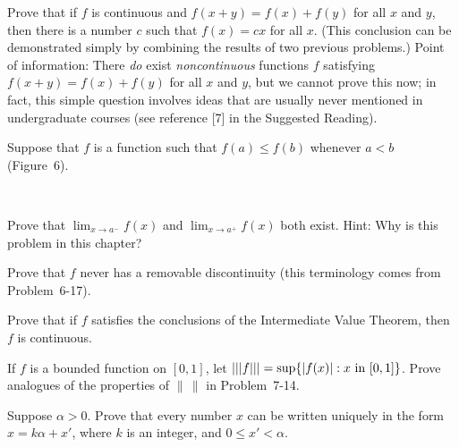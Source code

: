  Prove that if $f$ is continuous and $f(x+y) = f(x) + f(y)$ for all
$x$ and $y$, then there is a number $c$ such that $f(x) = cx$ for all $x$.
(This conclusion can be demonstrated simply by combining the results of two
previous problems.) Point of information: There \emph{do} exist
\emph{noncontinuous} functions $f$ satisfying $f(x+y) = f(x) + f(y)$ for all
$x$ and $y$, but we cannot prove this now; in fact, this simple question
involves ideas that are usually never mentioned in undergraduate courses
(see reference [7] in the Suggested Reading).

 Suppose that $f$ is a function such that $f(a) \leq f(b)$ whenever
$a < b$ (Figure~6).
\begin{center}
\\[0.6em]
\end{center}
\begin{letters}
\item Prove that $\lim_{x \to a^{-}} f(x)$ and $\lim_{x \to a^{+}} f(x)$ both
  exist. Hint: Why is this problem in this chapter?
\item Prove that $f$ never has a removable discontinuity (this terminology
  comes from Problem~6-17).
\item Prove that if $f$ satisfies the conclusions of the Intermediate Value
  Theorem, then $f$ is continuous.
\end{letters}

 If $f$ is a bounded function on $[0,1]$, let
$\lvert\lvert\lvert f \rvert\rvert\rvert
= \sup\{\lvert f(x)\rvert : x\text{ in }[0,1]\}$.
Prove analogues of the properties of $\lVert\,\rVert$ in Problem~7-14.

 Suppose $\alpha > 0$. Prove that every number $x$ can be written
uniquely in the form $x = k\alpha + x'$, where $k$ is an integer, and
$0 \leq x' < \alpha$.

